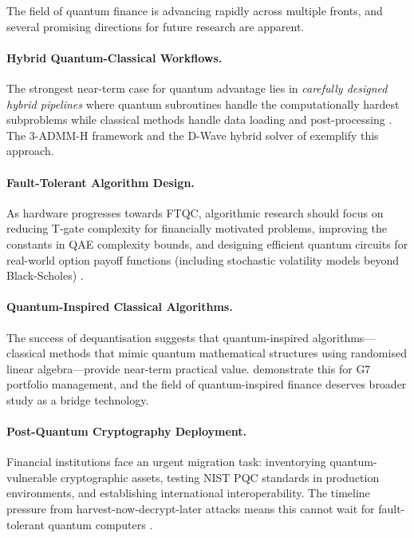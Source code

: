 \documentclass[12pt,a4paper]{article}
\begin{document}
The field of quantum finance is advancing rapidly across multiple fronts, and several promising directions for future research are apparent.

\paragraph{Hybrid Quantum-Classical Workflows.}
The strongest near-term case for quantum advantage lies in \emph{carefully designed hybrid pipelines} where quantum subroutines handle the computationally hardest subproblems while classical methods handle data loading and post-processing \citep{gong_quantum_2026-1, morapakula_end--end_2026, egger_quantum_2020}. The 3-ADMM-H framework \citep{egger_quantum_2020} and the D-Wave hybrid solver of \citet{morapakula_end--end_2026} exemplify this approach.

\paragraph{Fault-Tolerant Algorithm Design.}
As hardware progresses towards FTQC, algorithmic research should focus on reducing T-gate complexity for financially motivated problems, improving the constants in QAE complexity bounds, and designing efficient quantum circuits for real-world option payoff functions (including stochastic volatility models beyond Black-Scholes) \citep{stamatopoulos_option_2020, zhou_quantum_2026}.

\paragraph{Quantum-Inspired Classical Algorithms.}
The success of dequantisation suggests that quantum-inspired algorithms---classical methods that mimic quantum mathematical structures using randomised linear algebra---provide near-term practical value. \citet{chou_quantum-inspired_2026} demonstrate this for G7 portfolio management, and the field of quantum-inspired finance deserves broader study as a bridge technology.

\paragraph{Post-Quantum Cryptography Deployment.}
Financial institutions face an urgent migration task: inventorying quantum-vulnerable cryptographic assets, testing NIST PQC standards in production environments, and establishing international interoperability. The timeline pressure from harvest-now-decrypt-later attacks means this cannot wait for fault-tolerant quantum computers \citep{auer_quantum_2024, gong_quantum_2026-1}.
\end{document}
